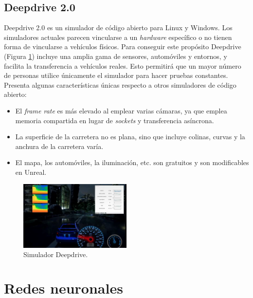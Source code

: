 \subsection{Deepdrive 2.0}

Deepdrive 2.0 \cite{deepdrive} es un simulador de código abierto para Linux y Windows. Los simuladores actuales parecen vincularse a un \textit{hardware} específico o no tienen forma de vincularse a vehículos físicos. Para conseguir este propósito Deepdrive (Figura \ref{fig.deepdrive}) incluye una amplia gama de sensores, automóviles y entornos, y facilita la transferencia a vehículos reales. Esto permitirá que un mayor número de personas utilice únicamente el simulador para hacer pruebas constantes.\\

Presenta algunas características únicas respecto a otros simuladores de código abierto:

\begin{itemize}
\item El \textit{frame rate} es más elevado al emplear varias cámaras, ya que emplea memoria compartida en lugar de \textit{sockets} y transferencia asíncrona.
\item La superficie de la carretera no es plana, sino que incluye colinas, curvas y la anchura de la carretera varía.
\item El mapa, los automóviles, la iluminación, etc. son gratuitos y son modificables en Unreal.
\end{itemize}

\begin{figure}
\begin{center}
	\includegraphics[width=0.5\textwidth]{figures/Estado_arte/deepdrive.png}
   \caption{Simulador Deepdrive.}
	\label{fig.deepdrive}
\end{center}
\end{figure}


\section{Redes neuronales}

